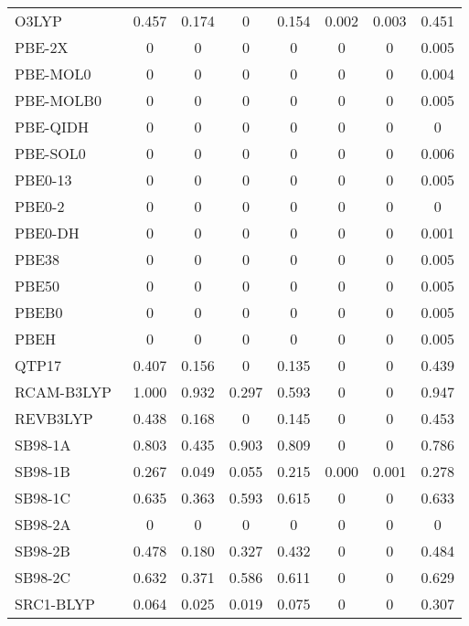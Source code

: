 \begin{table}
\begin{tabular}{|l|c|c|c|c|c|c|c|}
O3LYP~\cite{Hoe2001_319,Cohen2001_607} & 0.457 & 0.174 & 0 & 0.154 & 0.002 & 0.003 & 0.451 \\
PBE-2X~\cite{Tahchieva2018_4806} & 0 & 0 & 0 & 0 & 0 & 0 & 0.005 \\
PBE-MOL0~\cite{delCampo2012_104108} & 0 & 0 & 0 & 0 & 0 & 0 & 0.004 \\
PBE-MOLB0~\cite{delCampo2012_104108} & 0 & 0 & 0 & 0 & 0 & 0 & 0.005 \\
PBE-QIDH~\cite{Bremond2014_031101} & 0 & 0 & 0 & 0 & 0 & 0 & 0 \\
PBE-SOL0~\cite{delCampo2012_104108} & 0 & 0 & 0 & 0 & 0 & 0 & 0.006 \\
PBE0-13~\cite{Cortona2012_086101} & 0 & 0 & 0 & 0 & 0 & 0 & 0.005 \\
PBE0-2~\cite{Chai2012_121} & 0 & 0 & 0 & 0 & 0 & 0 & 0 \\
PBE0-DH~\cite{Bremond2011_024106} & 0 & 0 & 0 & 0 & 0 & 0 & 0.001 \\
PBE38~\cite{Grimme2010_154104} & 0 & 0 & 0 & 0 & 0 & 0 & 0.005 \\
PBE50~\cite{Bernard2012_204103} & 0 & 0 & 0 & 0 & 0 & 0 & 0.005 \\
PBEB0~\cite{delCampo2012_104108} & 0 & 0 & 0 & 0 & 0 & 0 & 0.005 \\
PBEH~\cite{Adamo1999_6158,Ernzerhof1999_5029} & 0 & 0 & 0 & 0 & 0 & 0 & 0.005 \\
QTP17~\cite{Jin2018_064111} & 0.407 & 0.156 & 0 & 0.135 & 0 & 0 & 0.439 \\
RCAM-B3LYP~\cite{Cohen2007_191109} & 1.000 & 0.932 & 0.297 & 0.593 & 0 & 0 & 0.947 \\
REVB3LYP~\cite{Lu2013_64} & 0.438 & 0.168 & 0 & 0.145 & 0 & 0 & 0.453 \\
SB98-1A~\cite{Schmider1998_9624} & 0.803 & 0.435 & 0.903 & 0.809 & 0 & 0 & 0.786 \\
SB98-1B~\cite{Schmider1998_9624} & 0.267 & 0.049 & 0.055 & 0.215 & 0.000 & 0.001 & 0.278 \\
SB98-1C~\cite{Schmider1998_9624} & 0.635 & 0.363 & 0.593 & 0.615 & 0 & 0 & 0.633 \\
SB98-2A~\cite{Schmider1998_9624} & 0 & 0 & 0 & 0 & 0 & 0 & 0 \\
SB98-2B~\cite{Schmider1998_9624} & 0.478 & 0.180 & 0.327 & 0.432 & 0 & 0 & 0.484 \\
SB98-2C~\cite{Schmider1998_9624} & 0.632 & 0.371 & 0.586 & 0.611 & 0 & 0 & 0.629 \\
SRC1-BLYP~\cite{Besley2009_10350} & 0.064 & 0.025 & 0.019 & 0.075 & 0 & 0 & 0.307 \\

\end{tabular}
\end{table}
